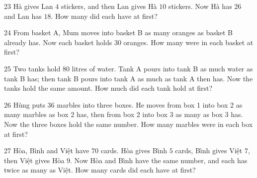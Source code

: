 \gap
\begin{probbox}{23}{\relax}
Hà gives Lan $4$ stickers, and then Lan gives Hà $10$ stickers. Now Hà has $26$ and Lan has $18$. How many did each have at first?
\end{probbox}
\gap
\begin{probbox}{24}{\relax}
From basket A, Mum moves into basket B as many oranges as basket B already has. Now each basket holds $30$ oranges. How many were in each basket at first?
\end{probbox}
\gap
\begin{probbox}{25}{\relax}
Two tanks hold $80$ litres of water. Tank A pours into tank B as much water as tank B has; then tank B pours into tank A as much as tank A then has. Now the tanks hold the same amount. How much did each tank hold at first?
\end{probbox}
\gap
\begin{probbox}{26}{\relax}
Hùng puts $36$ marbles into three boxes. He moves from box 1 into box 2 as many marbles as box 2 has, then from box 2 into box 3 as many as box 3 has. Now the three boxes hold the same number. How many marbles were in each box at first?
\end{probbox}
\gap
\begin{probbox}{27}{\relax}
Hòa, Bình and Việt have $70$ cards. Hòa gives Bình $5$ cards, Bình gives Việt $7$, then Việt gives Hòa $9$. Now Hòa and Bình have the same number, and each has twice as many as Việt. How many cards did each have at first?
\end{probbox}
